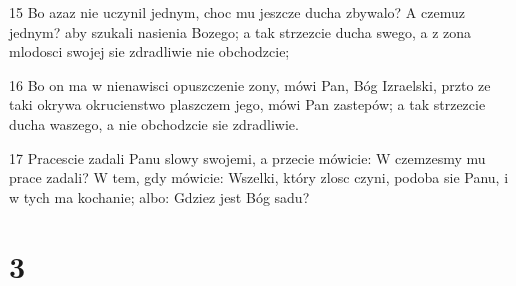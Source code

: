 \par 15 Bo azaz nie uczynil jednym, choc mu jeszcze ducha zbywalo? A czemuz jednym? aby szukali nasienia Bozego; a tak strzezcie ducha swego, a z zona mlodosci swojej sie zdradliwie nie obchodzcie;
\par 16 Bo on ma w nienawisci opuszczenie zony, mówi Pan, Bóg Izraelski, przto ze taki okrywa okrucienstwo plaszczem jego, mówi Pan zastepów; a tak strzezcie ducha waszego, a nie obchodzcie sie zdradliwie.
\par 17 Pracescie zadali Panu slowy swojemi, a przecie mówicie: W czemzesmy mu prace zadali? W tem, gdy mówicie: Wszelki, który zlosc czyni, podoba sie Panu, i w tych ma kochanie; albo: Gdziez jest Bóg sadu?

\chapter{3}

